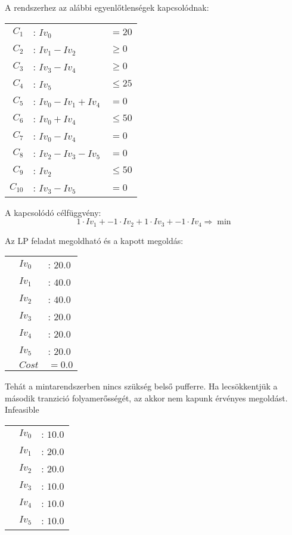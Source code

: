 A rendszerhez az alábbi egyenlőtlenségek kapcsolódnak:

\begin{center}
\begin{tabular}{rll}
$C_1$ &: $Iv_0$ &$= 20$ \\
$C_2$ &: $Iv_1 - Iv_2$ &$\geq 0$\\
$C_3$ &: $Iv_3 - Iv_4$ &$\geq 0$\\
$C_4$ &: $Iv_5$ &$\leq 25$\\
$C_5$ &: $Iv_0 - Iv_1 + Iv_4$ &$= 0$\\
$C_6$ &: $Iv_0 + Iv_4 $&$\leq 50$\\
$C_7$ &: $Iv_0 - Iv_4 $&$= 0$\\
$C_8$ &: $Iv_2 - Iv_3 - Iv_5$&$= 0$\\
$C_9$ &: $Iv_2 $&$\leq 50$\\
$C_{10}$ &: $Iv_3 - Iv_5 $&$= 0$
\end{tabular}
\end{center}

A kapcsolódó célfüggvény:
$$1\cdot Iv_1 + -1\cdot Iv_2 + 1\cdot Iv_3 + -1\cdot Iv_4\Rightarrow \min$$

Az LP feladat megoldható és a kapott megoldás:
\begin{center}
\begin{tabular}{rll}
&$Iv_0$ &: $20.0$\\
&$Iv_1$ &: $40.0$\\
&$Iv_2$ &: $40.0$\\
&$Iv_3$ &: $20.0$\\
&$Iv_4$ &: $20.0$\\
&$Iv_5$ &: $20.0$\\
&$Cost$ & $= 0.0$
\end{tabular}
\end{center}
Tehát a mintarendszerben nincs szükség belső pufferre. 
Ha lecsökkentjük a második tranzició folyamerősségét, az akkor nem kapunk érvényes megoldást. \\
Infeasible
\begin{center}
\begin{tabular}{rll}
&$Iv_0$ &: $10.0$\\
&$Iv_1$ &: $20.0$\\
&$Iv_2$ &: $20.0$\\
&$Iv_3$ &: $10.0$\\
&$Iv_4$ &: $10.0$\\
&$Iv_5$ &: $10.0$
\end{tabular}
\end{center}

